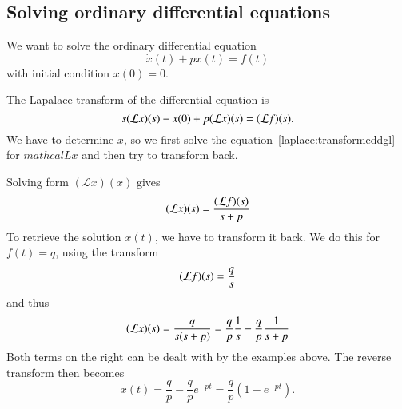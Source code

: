 \subsection{Solving ordinary differential equations}
We want to solve the ordinary differential equation
\[
\dot x(t)+px(t)=f(t)
\]
with initial condition $x(0)=0$.

The Lapalace transform of the differential equation is
\begin{equation}
s({\cal L}x)(s)-x(0)+p({\cal L}x)(s)=({\cal L}f)(s).
\label{laplace:transformeddgl}
\end{equation}
We have to determine $x$, so we first solve the
equation~\eqref{laplace:transformeddgl} for $mathcal{L}x$ and
then try to transform back.

Solving form $(\mathcal{L}x)(x)$ gives
\[
({\cal L}x)(s)
=
\frac{({\cal L}f)(s)}{s+p}
\]
To retrieve the solution $x(t)$, we have to transform it back.
We do this for $f(t)=q$, using the transform
\[
({\cal L}f)(s)=\frac{q}{s}
\]
and thus 
\[
({\cal L}x)(s)
=
\frac{q}{s(s+p)}=\frac{q}{p}\frac{1}{s}-\frac{q}{p}\frac{1}{s+p}
\]
Both terms on the right can be dealt with by the examples
above.
The reverse transform then becomes
\[
x(t)=\frac{q}{p}-\frac{q}{p}e^{-pt}=\frac{q}{p}(1-e^{-pt}).
\]


